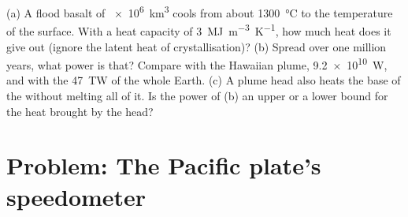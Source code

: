 \begin{exercise}[$\star\star\star$]\label{exo:b1:hotspots:12}
(a) A flood basalt of \qty{e6}{km^3} cools from about \qty{1300}{\celsius} to
the temperature of the surface. With a heat capacity of \qty{3}{MJ.m^{-3}.K^{-1}},
how much heat does it give out (ignore the latent heat of crystallisation)?
(b) Spread over one million years, what power is that? Compare with the
Hawaiian plume, \qty{9.2e10}{W}, and with the \qty{47}{TW} of the whole Earth.
(c) A plume head also heats the base of the  without melting all of
it. Is the power of (b) an upper or a lower bound for the heat brought by the
head?
\end{exercise}

\section{Problem: The Pacific plate's speedometer}

